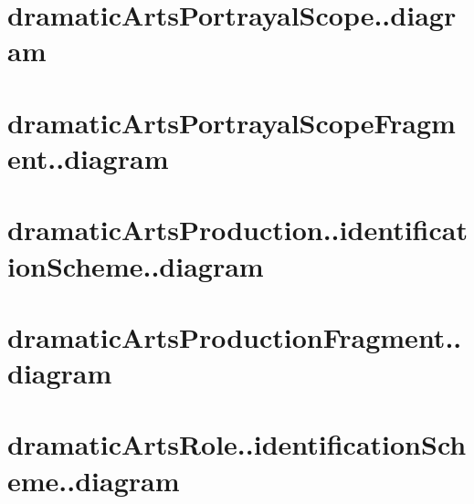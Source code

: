 \documentclass[10pt,a4paper]{article}
\begin{document}
\section{dramaticArtsPortrayalScope..diagram}

\newline
\section{dramaticArtsPortrayalScopeFragment..diagram}

\newline
\section{dramaticArtsProduction..identificationScheme..diagram}

\newline
\section{dramaticArtsProductionFragment..diagram}

\newline
\section{dramaticArtsRole..identificationScheme..diagram}

\newline
\end{document}
